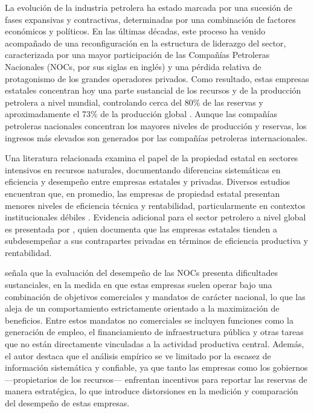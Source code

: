\documentclass[../../TFM.tex]{subfiles}
\begin{document}
	La evolución de la industria petrolera ha estado marcada por una sucesión de fases expansivas y contractivas, determinadas por una combinación de factores económicos y políticos. En las últimas décadas, este proceso ha venido acompañado de una reconfiguración en la estructura de liderazgo del sector, caracterizada por una mayor participación de las Compañías Petroleras Nacionales (NOCs, por sus siglas en inglés) y una pérdida relativa de protagonismo de los grandes operadores privados. Como resultado, estas empresas estatales concentran hoy una parte sustancial de los recursos y de la producción petrolera a nivel mundial, controlando cerca del 80\% de las reservas y aproximadamente el 73\% de la producción global \parencite{Makarova2007}. Aunque las compañías petroleras nacionales concentran los mayores niveles de producción y reservas, los ingresos más elevados son generados por las compañías petroleras internacionales.
	
	Una literatura relacionada examina el papel de la propiedad estatal en sectores intensivos en recursos naturales, documentando diferencias sistemáticas en eficiencia y desempeño entre empresas estatales y privadas. Diversos estudios encuentran que, en promedio, las empresas de propiedad estatal presentan menores niveles de eficiencia técnica y rentabilidad, particularmente en contextos institucionales débiles \parencite{Vining1992,Dewenter2001,Makarova2007}. Evidencia adicional para el sector petrolero a nivel global es presentada por \textcite{Wolf2009}, quien documenta que las empresas estatales tienden a subdesempeñar a sus contrapartes privadas en términos de eficiencia productiva y rentabilidad.
	
	\textcite{Makarova2007} señala que la evaluación del desempeño de las NOCs presenta dificultades sustanciales, en la medida en que estas empresas suelen operar bajo una combinación de objetivos comerciales y mandatos de carácter nacional, lo que las aleja de un comportamiento estrictamente orientado a la maximización de beneficios. Entre estos mandatos no comerciales se incluyen funciones como la generación de empleo, el financiamiento de infraestructura pública y otras tareas que no están directamente vinculadas a la actividad productiva central. Además, el autor destaca que el análisis empírico se ve limitado por la escasez de información sistemática y confiable, ya que tanto las empresas como los gobiernos —propietarios de los recursos— enfrentan incentivos para reportar las reservas de manera estratégica, lo que introduce distorsiones en la medición y comparación del desempeño de estas empresas.
	
\end{document}
